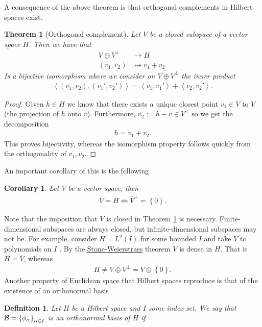 \documentclass[12pt]{article}
\newtheorem{theorem}{Theorem}
\newtheorem{definition}{Definition}
\newtheorem{corollary}{Corollary}
\newcommand{\br}[1]{\left\langle#1\right\rangle} \newcommand{\set}[1]{\left\{#1\right\}}\newcommand{\qt}[1]{\left(#1\right)} \newcommand{\qp}[1]{\left(#1\right)}\newcommand{\qb}[1]{\left[#1\right]}
\begin{document}
\begin{CJK*}{UTF8}{gbsn}
	A consequence of the above theorem is that orthogonal complements in Hilbert spaces exist.
	\begin{theorem}[Orthogonal complement]\label{complement theorem}
		Let $V$ be a closed subspace of a vector space  $H$. Then we have that
		\begin{align*}
			V \oplus V^\perp & \longrightarrow H   \\
			(v_1,v_2)        & \longmapsto v_1+v_2
			.\end{align*}
		Is a bijective isomorphism where we consider on $V \oplus V^\perp$ the inner product
		\begin{align*}
			\br{(v_1,v_2),(v_1',v_2')}= \br{v_1,v_1'}+ \br{v_2,v_2'}.
		\end{align*}
	\end{theorem}
	\begin{proof}
		Given $h \in  H$ we know that there exists a unique closest point  $v_1 \in V$ to $V$ (the projection of $h$ onto  $v$). Furthermore, $v_2:=h-v \in V^\perp$ so we get the decomposition
		\begin{align*}
			h=v_1 +v_2.
		\end{align*}
		This proves bijectivity, whereas the isomorphism property follows quickly from the orthogonality of $v_1,v_2$.
	\end{proof}
	An important corollary of this is the following
	\begin{corollary}\label{cor}
		Let $V$ be a vector space, then
		\begin{align*}
			\overline{V}=H \iff \overline{V}^\perp =\set{0} .
		\end{align*}
	\end{corollary}
	Note that the imposition that $V$ is closed in Theorem \ref{complement theorem} is necessary. Finite-dimensional subspaces are always closed, but infinite-dimensional subspaces may not be. For example, consider $H=L^2(I)$ for some bounded $I$ and take  $V$ to polynomials on $I$ . By the \href{https://en.wikipedia.org/wiki/Stone%E2%80%93Weierstrass_theorem}{Stone-Weierstrass} theorem $V $ is dense  in $H$. That is $H=\overline{V}$, whereas
	\begin{align*}
		H \neq V \oplus V^\perp =V \oplus \set{0} .
	\end{align*}
	Another property of Euclidean space that Hilbert spaces reproduce is that of the existence of an orthonormal basis
	\begin{definition}
		Let $H$ be a Hilbert space and  $I$ some index set. We say that $ \Bb=\set{\phi_\alpha}_{\alpha \in  I} $ is an orthonormal basis of $H$ if

\end{definition}
\end{CJK*}
\end{document}
